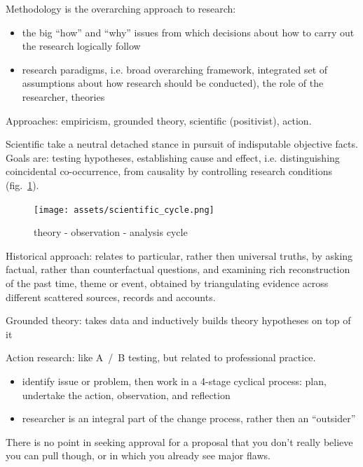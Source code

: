 \documentclass[10pt,a4paper,twocolumn]{article}
\begin{document}
Methodology is the overarching approach to research:
\begin{itemize}
  \item the big ``how'' and ``why'' issues from which decisions about how to carry out
  the research logically follow
  \item research paradigms, i.e. broad overarching framework, integrated set of assumptions
  about how research should be conducted), the role of the researcher, theories
\end{itemize}

Approaches: empiricism, grounded theory, scientific (positivist), action.

Scientific take a neutral detached stance in pursuit of indisputable objective facts.
Goals are: testing hypotheses, establishing cause and effect, i.e. distinguishing coincidental
  co-occurrence, from causality by controlling research conditions (fig.~\ref{fig:scientific_cycle}).
\begin{figure}[t]
  \centering
  \texttt{[image: assets/scientific\_cycle.png]}
  \caption{
    theory - observation - analysis cycle
  }
  \label{fig:scientific_cycle}  
\end{figure}

Historical approach: relates to particular, rather then universal truths, by asking factual,
rather than counterfactual questions, and examining rich reconstruction of the past time,
theme or event, obtained by triangulating evidence across different scattered sources,
records and accounts.

Grounded theory: takes data and inductively builds theory hypotheses on top of it

Action research: like A~/~B testing, but related to professional practice.
\begin{itemize}
  \item identify issue or problem, then work in a 4-stage cyclical process:
  plan, undertake the action, observation, and reflection
  \item researcher is an integral part of the change process, rather then an ``outsider''
\end{itemize}

There is no point in seeking approval for a proposal that you don't really believe you
can pull though, or in which you already see major flaws.
\end{document}
